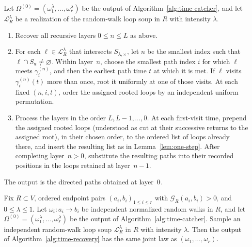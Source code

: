 \documentclass[10pt,a4paper]{amsart}
\newcommand{\Gc}{\mathcal G}
\newcommand{\Lc}{\mathcal L}
\begin{document}
\begin{algorithm}[Recovery]
\label{alg:time-recovery}
Let $\Omega^{(0)}=(\omega_1^\lambda,\ldots,\omega_r^\lambda)$ be the output of
Algorithm~\ref{alg:time-catcher}, and let
$\Lc_R^\lambda$ be a realization of the random-walk loop soup in $R$ with intensity $\lambda$.

\begin{enumerate}[label=\textup{(\arabic*)},leftmargin=2.4em]
\item Recover all recursive layers $0\le n\le L$ as above.

\item For each $\ell\in\Lc_R^\lambda$ that intersects
$S_{\lambda,\times}$, let $n$ be the smallest index such that
$\ell\cap S_n\ne\varnothing$. Within layer~$n$, choose the smallest path index $i$ for
which $\ell$ meets $\gamma_i^{(n)}$, and then the earliest path time $t$ at
which it is met. If $\ell$ visits $\gamma_i^{(n)}(t)$ more than once, root
it uniformly at one of those visits. At each fixed $(n,i,t)$, order the
assigned rooted loops by an independent uniform permutation.

\item Process the layers in the order $L,L-1,\ldots,0$. At each
first-visit time, prepend the assigned rooted loops (understood as cut at their successive returns to the assigned root), in their chosen order,
to the ordered list of loops already there, and insert the resulting list as
in Lemma~\ref{lem:one-step}. After completing layer~$n>0$, substitute the
resulting paths into their recorded positions in the loops retained at
layer~$n-1$.
\end{enumerate}

The output is the directed paths obtained at layer~$0$.
\end{algorithm}

\begin{proposition}\label{prop:path-recovery}
Fix $R\subset V$, ordered endpoint pairs $(a_i,b_i)_{1\le i\le r}$ with
$\Gc_R(a_i,b_i)>0$, and $0\le\lambda\le 1$. Let
$\omega_i:a_i\to b_i$ be independent normalized random walks in $R$, and let $\Omega^{(0)}
 =(\omega_1^\lambda,\ldots,\omega_r^\lambda)$ be the output of Algorithm~\ref{alg:time-catcher}. Sample an independent random-walk loop soup $\Lc_R^\lambda$ in $R$ with intensity $\lambda$. Then the output of Algorithm~\ref{alg:time-recovery} has
the same joint law as $(\omega_1,\ldots,\omega_r)$.
\end{proposition}
\end{document}
